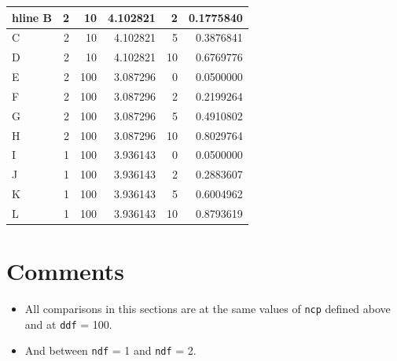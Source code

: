 \documentclass[
]{book}
\providecommand{\tightlist}{%
  \setlength{\itemsep}{0pt}\setlength{\parskip}{0pt}}
\begin{document}
\begin{tabular}{l|r|r|r|r|r}
hline
B & 2 & 10 & 4.102821 & 2 & 0.1775840\\
\hline
C & 2 & 10 & 4.102821 & 5 & 0.3876841\\
\hline
D & 2 & 10 & 4.102821 & 10 & 0.6769776\\
\hline
E & 2 & 100 & 3.087296 & 0 & 0.0500000\\
\hline
F & 2 & 100 & 3.087296 & 2 & 0.2199264\\
\hline
G & 2 & 100 & 3.087296 & 5 & 0.4910802\\
\hline
H & 2 & 100 & 3.087296 & 10 & 0.8029764\\
\hline
I & 1 & 100 & 3.936143 & 0 & 0.0500000\\
\hline
J & 1 & 100 & 3.936143 & 2 & 0.2883607\\
\hline
K & 1 & 100 & 3.936143 & 5 & 0.6004962\\
\hline
L & 1 & 100 & 3.936143 & 10 & 0.8793619\\
\hline
\end{tabular}

\hypertarget{comments-2}{%
\section{Comments}\label{comments-2}}

\begin{itemize}
\tightlist
\item
  All comparisons in this sections are at the same values of \texttt{ncp} defined above and at \texttt{ddf} = 100.
\item
  And between \texttt{ndf} = 1 and \texttt{ndf} = 2.
\end{itemize}
\end{document}
